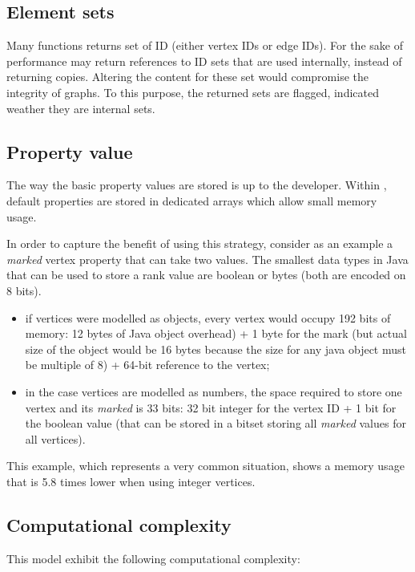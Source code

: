 \documentclass{article}
\begin{document}
\subsection{Element sets}

Many functions returns set of ID (either vertex IDs or edge IDs). For the sake of performance \grph may return references to
ID sets that are used internally, instead of returning copies. Altering the content for these set would compromise
the integrity of graphs. To this purpose, the returned sets are flagged, indicated weather they are internal sets.


 \subsection{Property value}
 
 The way the basic property values are stored is up to the developer. Within \grph, default properties are stored in dedicated arrays
 which allow small memory usage.
 
 In order to capture the benefit of using this strategy, consider as an example a \textit{marked} vertex property that can take two values.
 The smallest data types in Java that can be used to store a rank value are boolean or bytes (both are encoded on 8 bits).
\begin{itemize}
  \item if vertices were modelled as objects, every vertex would occupy 192 bits of memory: 12 bytes of Java object overhead) + 1 byte
  for the mark (but actual size of the object would be 16 bytes because the size for any java object must be multiple of 8) + 64-bit reference to the vertex;
  \item in the case vertices are modelled as numbers,
the space required to store one vertex and its \textit{marked}  is 33 bits: 32 bit integer for the vertex ID + 1 bit for the boolean value
(that can be stored in a bitset storing all \textit{marked} values for all vertices).
\end{itemize}
This example, which represents a very common situation, shows a memory usage that is 5.8 times lower when using integer vertices. 
 
 
 
\subsection{Computational complexity}
This model exhibit the following computational complexity:
\end{document}

